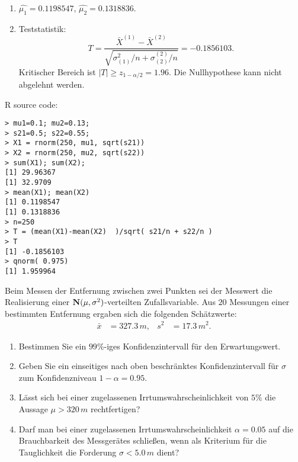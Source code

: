 \solution
\begin{enumerate}
    \item $\hat{\mu_1} = 0.1198547$, $\hat{\mu_2} = 0.1318836$.
    \item Teststatistik:
        \begin{equation*}
            T = \frac{ \bar X^{(1)} - \bar X^{(2)}}{ \sqrt{ \sigma^{2}_{(1)}/n + \sigma^{(2)}_{(2)}/n }} = -0.1856103.
        \end{equation*}
        Kritischer Bereich ist $| T | \geq z_{1-\alpha/2} = 1.96$. Die
        Nullhypothese kann nicht abgelehnt werden.
\end{enumerate}
R source code:
\begin{lstlisting}
> mu1=0.1; mu2=0.13; 
> s21=0.5; s22=0.55;
> X1 = rnorm(250, mu1, sqrt(s21))
> X2 = rnorm(250, mu2, sqrt(s22))
> sum(X1); sum(X2);
[1] 29.96367
[1] 32.9709
> mean(X1); mean(X2)
[1] 0.1198547
[1] 0.1318836
> n=250
> T = (mean(X1)-mean(X2)  )/sqrt( s21/n + s22/n )
> T
[1] -0.1856103
> qnorm( 0.975)
[1] 1.959964
\end{lstlisting}

 Beim Messen der
Entfernung zwischen zwei Punkten sei der Messwert die Realisierung einer
$\mathbf N(\mu, \sigma^2)$-verteilten Zufallsvariable. Aus $20$ Messungen einer
bestimmten Entfernung ergaben sich die folgenden Schätzwerte:
\begin{align*}
    \bar x &= 327.3\,m, & s^2 &= 17.3\,m^2.
\end{align*}
\begin{enumerate}
    \item Bestimmen Sie ein $99\%$-iges Konfidenzintervall für den
        Erwartungswert.

    \item Geben Sie ein einseitiges nach oben beschränktes Konfidenzintervall
        für $\sigma$ zum Konfidenzniveau $1-\alpha= 0.95$. 

    \item Lässt sich bei einer zugelassenen Irrtumswahrscheinlichkeit von $5\%$
        die Aussage $\mu > 320\,m$ rechtfertigen?

    \item Darf man bei einer zugelassenen Irrtumswahrscheinlichkeit
        $\alpha=0.05$ auf die Brauchbarkeit des Messgerätes schließen, wenn als
        Kriterium für die Tauglichkeit die Forderung $\sigma < 5.0\,m $ dient?
\end{enumerate}


